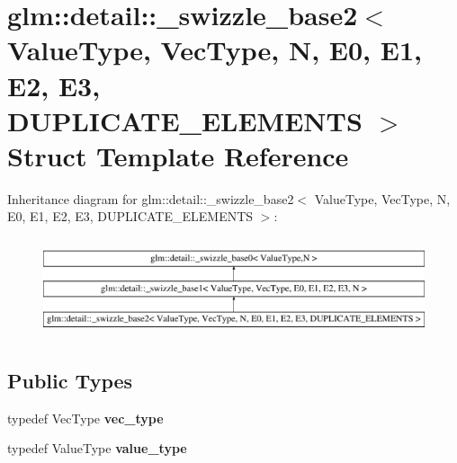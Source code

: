 \hypertarget{structglm_1_1detail_1_1__swizzle__base2}{\section{glm\-:\-:detail\-:\-:\-\_\-swizzle\-\_\-base2$<$ \-Value\-Type, \-Vec\-Type, \-N, \-E0, \-E1, \-E2, \-E3, \-D\-U\-P\-L\-I\-C\-A\-T\-E\-\_\-\-E\-L\-E\-M\-E\-N\-T\-S $>$ \-Struct \-Template \-Reference}
\label{structglm_1_1detail_1_1__swizzle__base2}
}
\-Inheritance diagram for glm\-:\-:detail\-:\-:\-\_\-swizzle\-\_\-base2$<$ \-Value\-Type, \-Vec\-Type, \-N, \-E0, \-E1, \-E2, \-E3, \-D\-U\-P\-L\-I\-C\-A\-T\-E\-\_\-\-E\-L\-E\-M\-E\-N\-T\-S $>$\-:\begin{figure}[H]
\begin{center}
\leavevmode
\includegraphics[height=2.906574cm]{structglm_1_1detail_1_1__swizzle__base2}
\end{center}
\end{figure}
\subsection*{\-Public \-Types}
\begin{DoxyCompactItemize}
\item 
\hypertarget{structglm_1_1detail_1_1__swizzle__base2_afad8673697b2a4bcbd1de30e49cc2a54}{typedef \-Vec\-Type {\bfseries vec\-\_\-type}}\label{structglm_1_1detail_1_1__swizzle__base2_afad8673697b2a4bcbd1de30e49cc2a54}

\item 
\hypertarget{structglm_1_1detail_1_1__swizzle__base2_a2b683ea47a63ff7d00943cd55b7c0b02}{typedef \-Value\-Type {\bfseries value\-\_\-type}}\label{structglm_1_1detail_1_1__swizzle__base2_a2b683ea47a63ff7d00943cd55b7c0b02}

\end{DoxyCompactItemize}
